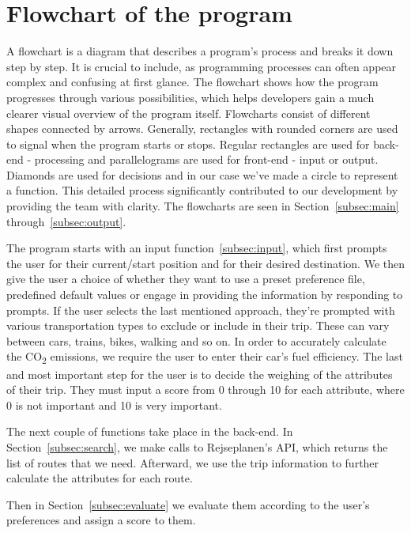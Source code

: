 \section{Flowchart of the program}

A flowchart is a diagram that describes a program's process and breaks it down step by step.
It is crucial to include, as programming processes can often appear complex and confusing at first glance.
The flowchart shows how the program progresses through various possibilities, which helps developers gain a much
clearer visual overview of the program itself.
Flowcharts consist of different shapes connected by arrows.
Generally, rectangles with rounded corners are used to signal when the program starts or stops.
Regular rectangles are used for back-end - processing and parallelograms are used for front-end - input or output.
Diamonds are used for decisions and in our case we've made a circle to represent a function.
This detailed process significantly contributed to our development by providing the team with clarity.
The flowcharts are seen in Section~\ref{subsec:main} through~\ref{subsec:output}.

The program starts with an input function~\ref{subsec:input}, which first prompts the user for their current/start
position and for their desired destination.
We then give the user a choice of whether they want to use a preset preference file, predefined default values or engage
in providing the information by responding to prompts.
If the user selects the last mentioned approach, they're prompted with various transportation types to exclude or
include in their trip.
These can vary between cars, trains, bikes, walking and so on.
In order to accurately calculate the \unit{CO_{2}} emissions, we require the user to enter their car's fuel efficiency.
The last and most important step for the user is to decide the weighing of the attributes of their trip.
They must input a score from 0 through 10 for each attribute, where 0 is not important and 10 is very important.

The next couple of functions take place in the back-end.
In Section~\ref{subsec:search}, we make calls to Rejseplanen's API, which returns the list of routes that we need.
Afterward, we use the trip information to further calculate the attributes for each route.

Then in Section~\ref{subsec:evaluate} we evaluate them according to the user's preferences and assign a score to them.

